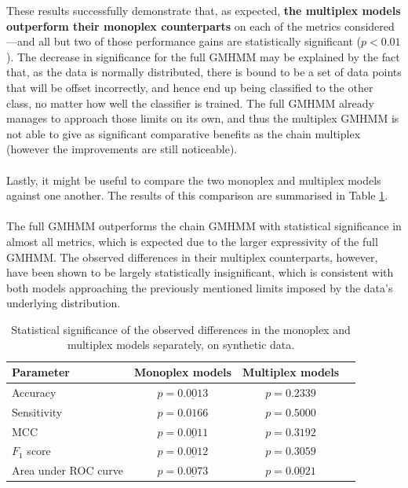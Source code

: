 \documentclass[12pt,a4paper,twoside,openright]{report}
\begin{document}
\noindent These results successfully demonstrate that, as expected, \textbf{the multiplex models outperform their monoplex counterparts} on each of the metrics considered---and all but two of those performance gains are statistically significant ($p < 0.01$). The decrease in significance for the full GMHMM may be explained by the fact that, as the data is normally distributed, there is bound to be a set of data points that will be offset incorrectly, and hence end up being classified to the other class, no matter how well the classifier is trained. The full GMHMM already manages to approach those limits on its own, and thus the multiplex GMHMM is not able to give as significant comparative benefits as the chain multiplex (however the improvements are still noticeable).\\ \\
Lastly, it might be useful to compare the two monoplex and multiplex models against one another. The results of this comparison are summarised in Table \ref{tblsyndata3}.\\ \\
The full GMHMM outperforms the chain GMHMM with statistical significance in almost all metrics, which is expected due to the larger expressivity of the full GMHMM. The observed differences in their multiplex counterparts, however, have been shown to be largely statistically insignificant, which is consistent with both models approaching the previously mentioned limits imposed by the data's underlying distribution.
\begin{table}[h]\centering
\begin{tabular}{ l c c r } \toprule
{\bf Parameter} & {\bf Monoplex models} & {\bf Multiplex models} \\ \midrule
Accuracy & $p = \underline{0.0013}$ & $p = 0.2339$ \\
Sensitivity & $p = 0.0166$ & $p = 0.5000$ \\
MCC & $p = \underline{0.0011}$ & $p = 0.3192$ \\
$F_1$ score & $p = \underline{0.0012}$ & $p = 0.3059$ \\
Area under ROC curve & $p = \underline{0.0073}$ & $p = \underline{0.0021}$\\
\bottomrule
\end{tabular}
\caption[Evaluation results on the chain GMHMM on synthetic data]{\centering Statistical significance of the observed differences in the monoplex and multiplex models separately, on synthetic data.}\label{tblsyndata3}
\end{table}
\end{document}
